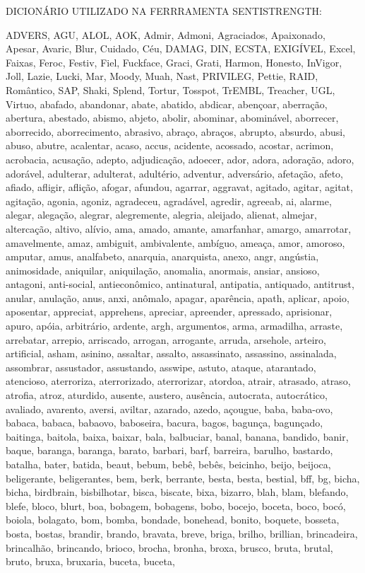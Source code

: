 \newpage
{}

DICIONÁRIO UTILIZADO NA FERRRAMENTA SENTISTRENGTH:



ADVERS, AGU, ALOL, AOK, Admir, Admoni, Agraciados, Apaixonado, Apesar, Avaric, Blur, Cuidado, Céu, DAMAG, DIN, ECSTA, EXIGÍVEL, Excel, Faixas, Feroc, Festiv, Fiel, Fuckface, Graci, Grati, Harmon, Honesto, InVigor, Joll, Lazie, Lucki, Mar, Moody, Muah, Nast, PRIVILEG, Pettie, RAID, Romântico, SAP, Shaki, Splend, Tortur, Tosspot, TrEMBL, Treacher, UGL, Virtuo, abafado, abandonar, abate, abatido, abdicar, abençoar, aberração, abertura, abestado, abismo, abjeto, abolir, abominar, abominável, aborrecer, aborrecido, aborrecimento, abrasivo, abraço, abraços, abrupto, absurdo, abusi, abuso, abutre, acalentar, acaso, accus, acidente, acossado, acostar, acrimon, acrobacia, acusação, adepto, adjudicação, adoecer, ador, adora, adoração, adoro, adorável, adulterar, adulterat, adultério, adventur, adversário, afetação, afeto, afiado, afligir, aflição, afogar, afundou, agarrar, aggravat, agitado, agitar, agitat, agitação, agonia, agoniz, agradeceu, agradável, agredir, agreeab, ai, alarme, alegar, alegação, alegrar, alegremente, alegria, aleijado, alienat, almejar, altercação, altivo, alívio, ama, amado, amante, amarfanhar, amargo, amarrotar, amavelmente, amaz, ambiguit, ambivalente, ambíguo, ameaça, amor, amoroso, amputar, amus, analfabeto, anarquia, anarquista, anexo, angr, angústia, animosidade, aniquilar, aniquilação, anomalia, anormais, ansiar, ansioso, antagoni, anti-social, antieconômico, antinatural, antipatia, antiquado, antitrust, anular, anulação, anus, anxi, anômalo, apagar, aparência, apath, aplicar, apoio, aposentar, appreciat, apprehens, apreciar, apreender, apressado, aprisionar, apuro, apóia, arbitrário, ardente, argh, argumentos, arma, armadilha, arraste, arrebatar, arrepio, arriscado, arrogan, arrogante, arruda, arsehole, arteiro, artificial, asham, asinino, assaltar, assalto, assassinato, assassino, assinalada, assombrar, assustador, assustando, asswipe, astuto, ataque, atarantado, atencioso, aterroriza, aterrorizado, aterrorizar, atordoa, atrair, atrasado, atraso, atrofia, atroz, aturdido, ausente, austero, ausência, autocrata, autocrático, avaliado, avarento, aversi, aviltar, azarado, azedo, açougue, baba, baba-ovo, babaca, babaca, babaovo, baboseira, bacura, bagos, bagunça, bagunçado, baitinga, baitola, baixa, baixar, bala, balbuciar, banal, banana, bandido, banir, baque, baranga, baranga, barato, barbari, barf, barreira, barulho, bastardo, batalha, bater, batida, beaut, bebum, bebê, bebês, beicinho, beijo, beijoca, beligerante, beligerantes, bem, berk, berrante, besta, besta, bestial, bff, bg, bicha, bicha, birdbrain, bisbilhotar, bisca, biscate, bixa, bizarro, blah, blam, blefando, blefe, bloco, blurt, boa, bobagem, bobagens, bobo, bocejo, boceta, boco, bocó, boiola, bolagato, bom, bomba, bondade, bonehead, bonito, boquete, bosseta, bosta, bostas, brandir, brando, bravata, breve, briga, brilho, brillian, brincadeira, brincalhão, brincando, brioco, brocha, bronha, broxa, brusco, bruta, brutal, bruto, bruxa, bruxaria, buceta, buceta, 
